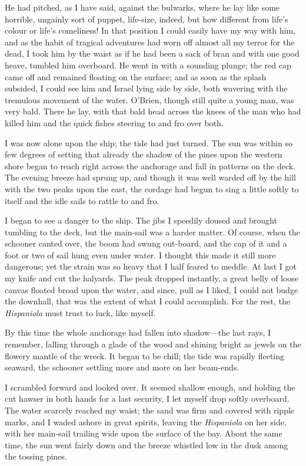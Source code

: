 He had pitched, as I have said, against the bulwarks, where he lay like some horrible, ungainly sort of puppet, life-size, indeed, but how different from life’s colour or life’s comeliness! In that position I could easily have my way with him, and as the habit of tragical adventures had worn off almost all my terror for the dead, I took him by the waist as if he had been a sack of bran and with one good heave, tumbled him overboard. He went in with a sounding plunge; the red cap came off and remained floating on the surface; and as soon as the splash subsided, I could see him and Israel lying side by side, both wavering with the tremulous movement of the water. O’Brien, though still quite a young man, was very bald. There he lay, with that bald head across the knees of the man who had killed him and the quick fishes steering to and fro over both.

I was now alone upon the ship; the tide had just turned. The sun was within so few degrees of setting that already the shadow of the pines upon the western shore began to reach right across the anchorage and fall in patterns on the deck. The evening breeze had sprung up, and though it was well warded off by the hill with the two peaks upon the east, the cordage had begun to sing a little softly to itself and the idle sails to rattle to and fro.

I began to see a danger to the ship. The jibs I speedily doused and brought tumbling to the deck, but the main-sail was a harder matter. Of course, when the schooner canted over, the boom had swung out-board, and the cap of it and a foot or two of sail hung even under water. I thought this made it still more dangerous; yet the strain was so heavy that I half feared to meddle. At last I got my knife and cut the halyards. The peak dropped instantly, a great belly of loose canvas floated broad upon the water, and since, pull as I liked, I could not budge the downhall, that was the extent of what I could accomplish. For the rest, the \textit{Hispaniola} must trust to luck, like myself.

By this time the whole anchorage had fallen into shadow---the last rays, I remember, falling through a glade of the wood and shining bright as jewels on the flowery mantle of the wreck. It began to be chill; the tide was rapidly fleeting seaward, the schooner settling more and more on her beam-ends.

I scrambled forward and looked over. It seemed shallow enough, and holding the cut hawser in both hands for a last security, I let myself drop softly overboard. The water scarcely reached my waist; the sand was firm and covered with ripple marks, and I waded ashore in great spirits, leaving the \textit{Hispaniola} on her side, with her main-sail trailing wide upon the surface of the bay. About the same time, the sun went fairly down and the breeze whistled low in the dusk among the tossing pines.

